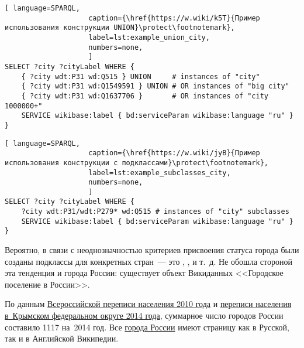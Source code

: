 \begin{lstlisting}[ language=SPARQL, 
                    caption={\href{https://w.wiki/k5T}{Пример использования конструкции UNION}\protect\footnotemark},
                    label=lst:example_union_city,
                    numbers=none,
                    ]
SELECT ?city ?cityLabel WHERE {
    { ?city wdt:P31 wd:Q515 } UNION     # instances of "city"            
    { ?city wdt:P31 wd:Q1549591 } UNION # OR instances of "big city"               
    { ?city wdt:P31 wd:Q1637706 }       # OR instances of "city 1000000+"
    SERVICE wikibase:label { bd:serviceParam wikibase:language "ru" }
}
\end{lstlisting}




\newpage
\begin{lstlisting}[ language=SPARQL, 
                    caption={\href{https://w.wiki/jyB}{Пример использования конструкции с подклассами}\protect\footnotemark},
                    label=lst:example_subclasses_city,
                    numbers=none,
                    ]
SELECT ?city ?cityLabel WHERE {
    ?city wdt:P31/wdt:P279* wd:Q515 # instances of "city" subclasses
    SERVICE wikibase:label { bd:serviceParam wikibase:language "ru" }
}
\end{lstlisting}

Вероятно, в связи с неоднозначностью критериев присвоения статуса города 
были созданы подклассы для конкретных стран~--- это , 
,  и т.~д. 
Не обошла стороной эта тенденция и города России: 
существует объект Викиданных <<Городское поселение в России>>.


По данным \href{https://bit.ly/2JPL34b}{Всероссийской переписи населения 2010 года}\autocite{city_perepis_2010} 
и \href{https://bit.ly/2Lflc6F}{переписи населения в~Крымском федеральном округе 2014 года}\autocite{city_perepis_2014}, 
суммарное число городов России составило \num{1117} на~2014 год. 
Все \href{https://w.wiki/oLE}{города России} имеют страницу как в Русской, так и в Английской Википедии.

